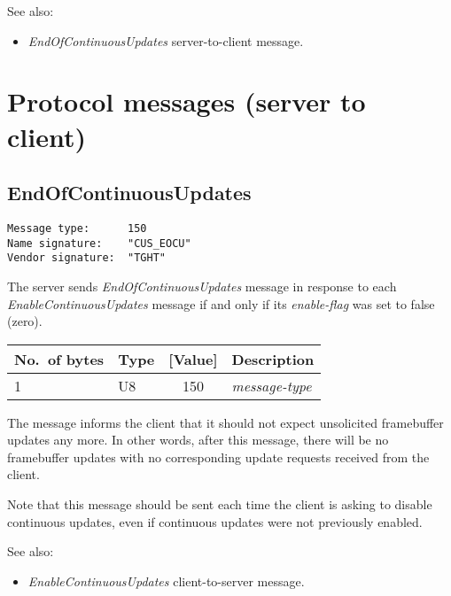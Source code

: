 \documentclass[a4paper]{article}
\newcommand{\typestr}[1]{\textit{#1}}
\begin{document}
See also:
\begin{itemize}
\item \typestr{EndOfContinuousUpdates} server-to-client message.
\end{itemize}

\newpage
\section{Protocol messages (server to client)}

\subsection{EndOfContinuousUpdates}
\begin{verbatim}
Message type:      150
Name signature:    "CUS_EOCU"
Vendor signature:  "TGHT"
\end{verbatim}

The server sends \typestr{EndOfContinuousUpdates} message in response
to each \typestr{EnableContinuousUpdates} message if and only if its
\typestr{enable-flag} was set to false (zero).

\begin{tabular}{l|lc|l} \hline
No.\ of bytes & Type & [Value] & Description \\ \hline
1 & U8  & 150 & \typestr{message-type} \\
\hline\end{tabular}

The message informs the client that it should not expect unsolicited
framebuffer updates any more. In other words, after this message,
there will be no framebuffer updates with no corresponding update
requests received from the client.

Note that this message should be sent each time the client is asking
to disable continuous updates, even if continuous updates were not
previously enabled.

See also:
\begin{itemize}
\item \typestr{EnableContinuousUpdates} client-to-server message.
\end{itemize}
\end{document}
